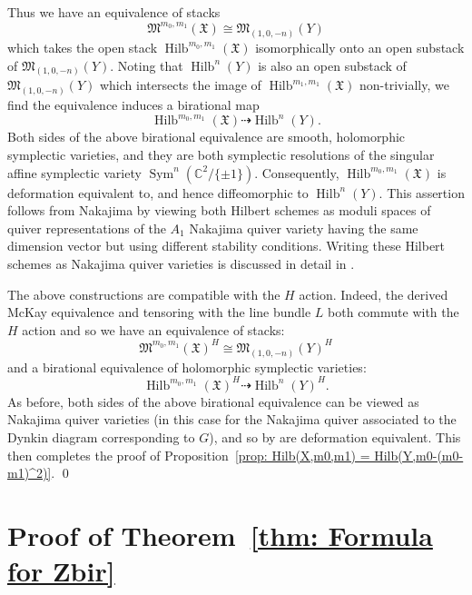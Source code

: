 \documentclass{amsart}
\theoremstyle{definition}
\newcommand{\CC} {{\mathbb C}}          %
\newcommand{\X}{\mathfrak{X}}
\newcommand{\M}{\mathfrak{M}}
\newcommand{\Sym}{\operatorname{Sym}}
\newcommand{\Hilb}{\operatorname{Hilb}}
\begin{document}
Thus we have an equivalence of stacks
\[
\M^{m_{0},m_{1}}(\X ) \cong \M_{(1,0,-n)}(Y)
\]
which takes the open stack $\Hilb^{m_{0},m_{1}}(\X )$ isomorphically
onto an open substack of $\M_{(1,0,-n)} (Y)$. Noting that
$\Hilb^{n}(Y)$ is also an open substack of $\M_{(1,0,-n)} (Y)$ which
intersects the image of $\Hilb^{m_{1},m_{1}}(\X )$ non-trivially, we
find the equivalence induces a birational map
\[
\Hilb^{m_{0},m_{1}}(\X ) \dashrightarrow \Hilb^{n}(Y).
\]
Both sides of the above birational equivalence are smooth, holomorphic
symplectic varieties, and they are both symplectic resolutions of the
singular affine symplectic variety $\Sym^{n} (\CC^{2}/\{\pm 1
\})$. Consequently, $\Hilb^{m_{0},m_{1}}(\X )$ is deformation
equivalent to, and hence diffeomorphic to $\Hilb^{n}(Y)$. This
assertion follows from Nakajima \cite[Cor~4.2]{Nakajima1994Duke} by
viewing both Hilbert schemes as moduli spaces of quiver
representations of the $A_{1}$ Nakajima quiver variety having the same
dimension vector but using different stability conditions. Writing
these Hilbert schemes as Nakajima quiver varieties is discussed in
detail in \cite{Kuznetsov}.


The above constructions are compatible with the $H$ action. Indeed,
the derived McKay equivalence and tensoring with the line bundle $L$
both commute with the $H$ action and so we have an equivalence of
stacks: 
\[
\M^{m_{0},m_{1}}(\X )^{H} \cong \M_{(1,0,-n)}(Y)^{H}
\]
and a birational equivalence of holomorphic symplectic varieties:
\[
\Hilb^{m_{0},m_{1}}(\X )^{H} \dashrightarrow \Hilb^{n}(Y)^{H}.
\]
As before, both sides of the above birational equivalence can be
viewed as Nakajima quiver varieties (in this case for the Nakajima
quiver associated to the Dynkin diagram corresponding to $G$), and so
by \cite[Cor~4.2]{Nakajima1994Duke} are deformation equivalent. This
then completes the proof of Proposition~\ref{prop: Hilb(X,m0,m1) =
Hilb(Y,m0-(m0-m1)^2)}. \qed


\section{Proof of Theorem~\ref{thm: Formula for Zbir}}
\label{sec: proof of thm about Zbir}
\end{document}
